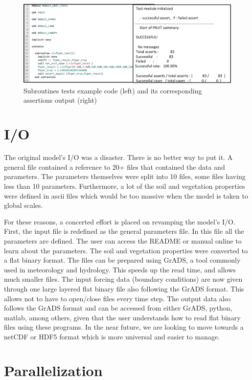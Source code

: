 \documentclass[pdftex,12pt,a4paper]{article}
\begin{document}
\begin{figure}[h]
	\centering
	\includegraphics[width=5.5in]{Figures/Tests2.png}
	\caption{Subroutines tests example code (left) and its corresponding assertions output (right)}
	\label{Tests1}
\end{figure}

\section{I/O}

The original model's I/O was a disaster. There is no better way to put it. A general file contained a reference to 20+ files that contained the data and parameters. The parameters themselves were split into 10 files, some files having less than 10 parameters. Furthermore, a lot of the soil and vegetation properties were defined in ascii files which would be too massive when the model is taken to global scales. 

For these reasons, a concerted effort is placed on revamping the model's I/O. First, the input file is redefined as the general parameters file. In this file all the parameters are defined. The user can access the README or manual online to learn about the parameters. The soil and vegetation properties were converted to a flat binary format. The files can be prepared using GrADS, a tool commonly used in meteorology and hydrology. This speeds up the read time, and allows much smaller files. The input forcing data (boundary conditions) are now given through one large layered flat binary file also following the GrADS format. This allows not to have to open/close files every time step. The output data also follows the GrADS format and can be accessed from either GrADS, python, matlab, among others, given that the user understands how to read flat binary files using these programs. In the near future, we are looking to move towards a netCDF or HDF5 format which is more universal and easier to manage.

\section{Parallelization}
\end{document}
